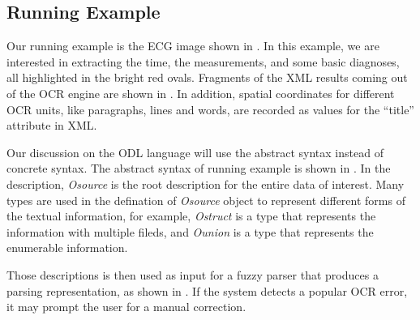 \subsection{Running Example}
Our running example is the ECG image shown in . 
In this example, we are interested in extracting the time, the measurements, 
and some basic diagnoses, all highlighted in the bright red ovals.
Fragments of the XML results coming out of the OCR engine are shown 
in . In addition, spatial coordinates for different 
OCR units, like paragraphs, lines and words, are recorded as values  
for the ``title'' attribute in XML. 

Our discussion on the ODL language
will use the abstract syntax instead of concrete syntax. 
The abstract syntax of running example
is shown in . 
In the description, 
{\em Osource} is the root description for the entire data of interest. 
Many types are used in the defination of {\em Osource} object to represent 
different forms of the textual information, for example, {\em Ostruct} is a type that 
represents the information with multiple fileds, and {\em Ounion} is a 
type that represents the enumerable information. 

%
%




Those descriptions is then used as input for a fuzzy parser 
that produces a parsing representation, as shown in . 
If the system detects a popular OCR error, it may prompt the user for a
manual correction.

